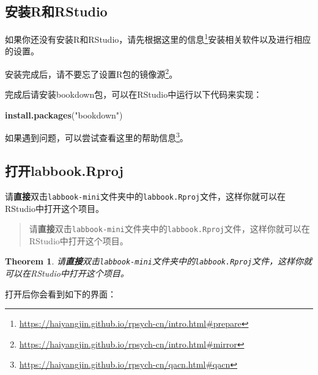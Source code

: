 \documentclass[]{ctexbook}
\newenvironment{Shaded}{\begin{snugshade}}{\end{snugshade}}
\newcommand{\FunctionTok}[1]{\textcolor[rgb]{0.13,0.29,0.53}{\textbf{#1}}}
\newcommand{\NormalTok}[1]{#1}
\newcommand{\StringTok}[1]{\textcolor[rgb]{0.31,0.60,0.02}{#1}}
\renewcommand{\href}[2]{#2\footnote{\url{#1}}}
\newtheorem{theorem}{Theorem}[chapter]
\theoremstyle{definition}
\theoremstyle{definition}
\theoremstyle{definition}
\theoremstyle{definition}
\theoremstyle{remark}
\begin{document}
\subsection{安装R和RStudio}\label{ux5b89ux88c5rux548crstudio}

如果你还没有安装R和RStudio，请先根据\href{https://haiyangjin.github.io/rpsych-cn/intro.html\#prepare}{这里的信息}安装相关软件以及进行相应的设置。

安装完成后，请不要忘了\href{https://haiyangjin.github.io/rpsych-cn/intro.html\#mirror}{设置R包的镜像源}。

完成后请安装bookdown包，可以在RStudio中运行以下代码来实现：

\begin{Shaded}
\begin{Highlighting}[]
\FunctionTok{install.packages}\NormalTok{(}\StringTok{"bookdown"}\NormalTok{)}
\end{Highlighting}
\end{Shaded}

如果遇到问题，可以尝试查看这里的\href{https://haiyangjin.github.io/rpsych-cn/qacn.html\#qacn}{帮助信息}。

\subsection{打开labbook.Rproj}\label{ux6253ux5f00labbook.rproj}

请\textbf{直接}双击\texttt{labbook-mini}文件夹中的\texttt{labbook.Rproj}文件，这样你就可以在RStudio中打开这个项目。

\begin{quote}
请\textbf{直接}双击\texttt{labbook-mini}文件夹中的\texttt{labbook.Rproj}文件，这样你就可以在RStudio中打开这个项目。
\end{quote}

\begin{theorem}
请\textbf{直接}双击\texttt{labbook-mini}文件夹中的\texttt{labbook.Rproj}文件，这样你就可以在RStudio中打开这个项目。
\end{theorem}

打开后你会看到如下的界面：
\end{document}

